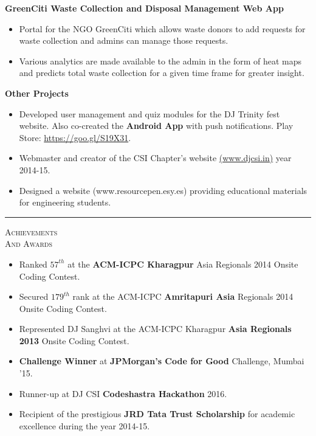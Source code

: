 \documentclass[11pt,a4paper]{article}
\newcommand{\bspace}{\vspace{4.0mm}} %
\begin{document}
	\begin{minipage}[t]{0.8\textwidth}
		
		\justify
		\textbf{GreenCiti Waste Collection and Disposal Management Web App}
		\begin{itemize}[noitemsep, leftmargin=*, topsep=0pt]
			\item Portal for the NGO GreenCiti which allows waste donors to add requests for waste collection and admins can manage those requests.
			\item Various analytics are made available to the admin in the form of heat maps and predicts total waste collection for a given time frame for greater insight.
		\end{itemize}
		
		\justify
		\textbf{Other Projects}
		\begin{itemize}[noitemsep, leftmargin=*, topsep=0pt]
			\item Developed user management and quiz modules for the DJ Trinity fest website. Also co-created the \textbf{Android App} with push notifications. Play Store: \href{https://goo.gl/S19X31}{https://goo.gl/S19X31}.
			\item Webmaster and creator of the CSI Chapter's website \href{http://www.djcsi.in}{(www.djcsi.in)} year 2014-15.
			\item Designed a website (www.resourcepen.esy.es) providing educational materials for engineering students.
		\end{itemize}
	\end{minipage}
	
	\bspace
	\hrule
	\bspace
	
	\begin{minipage}[t]{0.2\textwidth}
		\textsc{Achievements\\And Awards} 
	\end{minipage}
	\begin{minipage}[t]{0.8\textwidth}
		\justify
		\begin{itemize}[noitemsep, leftmargin=*]
			\item Ranked $57^{th}$ at the \textbf{ACM-ICPC Kharagpur} Asia Regionals 2014 Onsite Coding Contest.
			\item Secured $179^{th}$ rank at the ACM-ICPC \textbf{Amritapuri Asia} Regionals 2014 Onsite Coding Contest.
			\item Represented DJ Sanghvi at the ACM-ICPC Kharagpur \textbf{Asia Regionals 2013} Onsite Coding Contest.
			\item \textbf{Challenge Winner} at \textbf{JPMorgan's Code for Good} Challenge, Mumbai '15.
			\item Runner-up at DJ CSI \textbf{Codeshastra Hackathon} 2016.
			\item Recipient of the prestigious \textbf{JRD Tata Trust Scholarship} for academic excellence during the year 2014-15.
		\end{itemize}
	\end{minipage}
	
\end{document}
